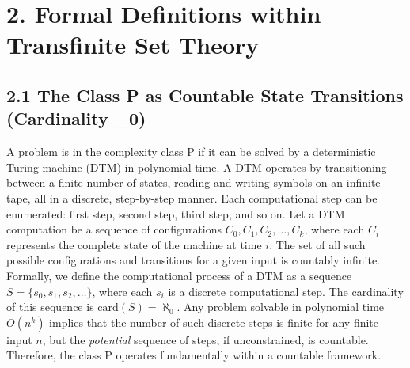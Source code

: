 \documentclass[11pt,twocolumn]{article}
\begin{document}
\section{2. Formal Definitions within Transfinite Set Theory}

\subsection{2.1 The Class P as Countable State Transitions (Cardinality \aleph_0)}
A problem is in the complexity class P if it can be solved by a deterministic Turing machine (DTM) in polynomial time. A DTM operates by transitioning between a finite number of states, reading and writing symbols on an infinite tape, all in a discrete, step-by-step manner. Each computational step can be enumerated: first step, second step, third step, and so on.
Let a DTM computation be a sequence of configurations $C_0, C_1, C_2, \dots, C_k$, where each $C_i$ represents the complete state of the machine at time $i$. The set of all such possible configurations and transitions for a given input is countably infinite.
Formally, we define the computational process of a DTM as a sequence $S = \{s_0, s_1, s_2, \dots \}$, where each $s_i$ is a discrete computational step. The cardinality of this sequence is $\text{card}(S) = \aleph_0$. Any problem solvable in polynomial time $O(n^k)$ implies that the number of such discrete steps is finite for any finite input $n$, but the \textit{potential} sequence of steps, if unconstrained, is countable. Therefore, the class P operates fundamentally within a countable framework.
\end{document}
